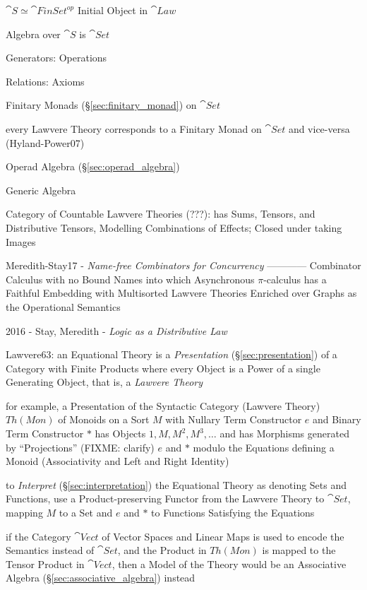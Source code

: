 $\cat{S} \simeq \cat{FinSet}^{op}$ Initial Object in $\cat{Law}$

Algebra over $\cat{S}$ is $\cat{Set}$

Generators: Operations

Relations: Axioms

Finitary Monads (\S\ref{sec:finitary_monad}) on $\cat{Set}$

every Lawvere Theory corresponds to a Finitary Monad on $\cat{Set}$ and
vice-versa (Hyland-Power07)

Operad Algebra (\S\ref{sec:operad_algebra})

Generic Algebra

Category of Countable Lawvere Theories (???): has Sums, Tensors, and
Distributive Tensors, Modelling Combinations of Effects; Closed under
taking Images \cite{hyland-power06}

Meredith-Stay17 - \emph{Name-free Combinators for Concurrency} ------------
Combinator Calculus with no Bound Names into which Asynchronous
$\pi$-calculus has a Faithful Embedding with Multisorted Lawvere
Theories Enriched over Graphs as the Operational Semantics

\asterism

2016 - Stay, Meredith - \emph{Logic as a Distributive Law}

Lawvere63: an Equational Theory is a \emph{Presentation}
(\S\ref{sec:presentation}) of a Category with Finite Products
where every Object is a Power of a single Generating Object, that is, a
\emph{Lawvere Theory}

for example, a Presentation of the Syntactic Category (Lawvere Theory) $Th(Mon)$
of Monoids on a Sort $M$ with Nullary Term Constructor $e$ and Binary Term
Constructor $*$ has Objects $1, M, M^2, M^3, \ldots$ and has Morphisms generated
by ``Projections'' (FIXME: clarify) $e$ and $*$ modulo the Equations defining a
Monoid (Associativity and Left and Right Identity)

to \emph{Interpret} (\S\ref{sec:interpretation}) the Equational Theory as
denoting Sets and Functions, use a Product-preserving Functor from the Lawvere
Theory to $\cat{Set}$, mapping $M$ to a Set and $e$ and $*$ to Functions
Satisfying the Equations

if the Category $\cat{Vect}$ of Vector Spaces and Linear Maps is used to encode
the Semantics instead of $\cat{Set}$, and the Product in $Th(Mon)$ is mapped to
the Tensor Product in $\cat{Vect}$, then a Model of the Theory would be an
Associative Algebra (\S\ref{sec:associative_algebra}) instead

